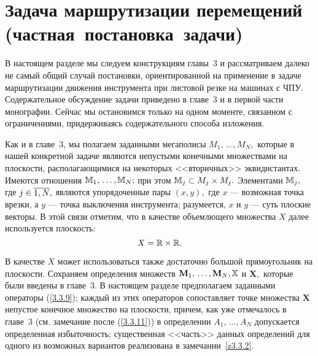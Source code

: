 
\section{
  Задача маршрутизации перемещений
  (частная~постановка~задачи)
}
\label{sect:5.2}
\setcounter{equation}{0}

В настоящем разделе мы следуем конструкциям главы~3
и рассматриваем далеко не самый общий случай постановки,
ориентированной на применение в задаче маршрутизации
движения инструмента при листовой резке на машинах с ЧПУ.
Содержательное обсуждение задачи приведено в главе~3
и в первой части монографии.
Сейчас мы остановимся только на одном моменте,
связанном с ограничениями,
придерживаясь содержательного способа изложения.


Как и в главе~3, 
мы полагаем заданными мегаполисы
$M_1,\,\ldots,M_N,$
которые в нашей конкретной задаче являются непустыми конечными множествами на плоскости,
располагающимися на некоторых <<вторичных>> эквидистантах.
Имеются отношения
$\bbm_1,\,\ldots,\bbm_N;$
при этом ${\mathbb M}_j\subset M_j\times M_j.$
Элементами
${\mathbb M}_j,$ где $j\in \ov{1,N},$
являются упорядоченные пары $(x,y),$
где $x$ --- возможная точка врезки,
а $y$ --- точка выключения инструмента;
разумеется, $x$
и $y$ --- суть плоские векторы.
В этой связи отметим, что в качестве объемлющего
множества $X$ далее используется плоскость:
$$
  X = {\mathbb R}\times {\mathbb R}
  .
$$

В качестве $X$
может использоваться также достаточно большой прямоугольник на плоскости.
Сохраняем определения множеств
$\mathbf{M}_1,\,\ldots,\mathbf{M}_N, \bbx$
и $\mathbf{X},$
которые были введены в главе~3.
В настоящем разделе предполагаем заданными операторы (\ref{3.3.9});
каждый из этих операторов сопоставляет точке множества $\mathbf{X}$
непустое конечное множество на плоскости,
причем, как уже отмечалось в главе~3
(см. замечание после (\ref{3.3.11}))
в определении $A_1,\,\ldots,A_N$
допускается определенная избыточность;
существенная <<часть>> данных определений
для одного из возможных вариантов реализована в замечании~\ref{z3.3.2}.

